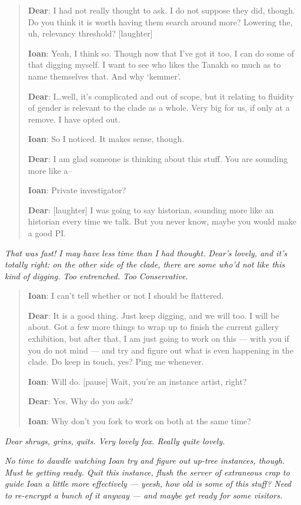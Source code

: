 \begin{quote}
\textbf{Dear}: I had not really thought to ask. I do not suppose they did, though. Do you think it is worth having them search around more? Lowering the, uh, relevancy threshold? {[}laughter{]}

\textbf{Ioan}: Yeah, I think so. Though now that I've got it too, I can do some of that digging myself. I want to see who likes the Tanakh so much as to name themselves that. And why `kemmer'.

\textbf{Dear}: I\ldots{}well, it's complicated and out of scope, but it relating to fluidity of gender is relevant to the clade as a whole. Very big for us, if only at a remove. I have opted out.

\textbf{Ioan}: So I noticed. It makes sense, though.

\textbf{Dear}: I am glad someone is thinking about this stuff. You are sounding more like a--

\textbf{Ioan}: Private investigator?

\textbf{Dear}: {[}laughter{]} I was going to say historian, sounding more like an historian every time we talk. But you never know, maybe you would make a good PI.
\end{quote}

\emph{That was fast! I may have less time than I had thought. Dear's lovely, and it's totally right: on the other side of the clade, there are some who'd not like this kind of digging. Too entrenched. Too Conservative.}

\begin{quote}
\textbf{Ioan}: I can't tell whether or not I should be flattered.

\textbf{Dear}: It is a good thing. Just keep digging, and we will too. I will be about. Got a few more things to wrap up to finish the current gallery exhibition, but after that, I am just going to work on this — with you if you do not mind — and try and figure out what is even happening in the clade. Do keep in touch, yes? Ping me whenever.

\textbf{Ioan}: Will do. {[}pause{]} Wait, you're an instance artist, right?

\textbf{Dear}: Yes. Why do you ask?

\textbf{Ioan}: Why don't you fork to work on both at the same time?
\end{quote}

\emph{Dear shrugs, grins, quits. Very lovely fox. Really quite lovely.}

\emph{No time to dawdle watching Ioan try and figure out up-tree instances, though. Must be getting ready. Quit this instance, flush the server of extraneous crap to guide Ioan a little more effectively — yeesh, how old is some of this stuff? Need to re-encrypt a bunch of it anyway — and maybe get ready for some visitors.}

